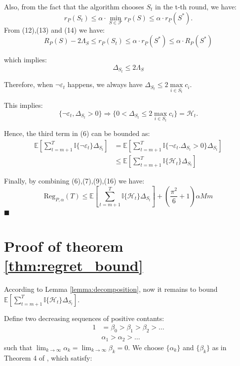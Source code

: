 \documentclass[opre,sglanonrev]{informs4}
\begin{document}
Also, from the fact that the algorithm chooses $S_t$ in the t-th round, we have:
\begin{equation}
	r_{\underline{P}}(S_t)\leq \alpha \cdot \mathop{\min}\limits_{S \in \mathcal{F}}r_{\underline{P}}(S) \leq \alpha \cdot r_{\underline{P}}(S^*).
\end{equation}
From (12),(13) and (14) we have:
\begin{equation}
	R_P(S)-2\Lambda_S \leq r_{\underline{P}}(S_t) \leq \alpha \cdot r_{\underline{P}}(S^*) \leq \alpha \cdot R_P(S^*)
\end{equation}

which implies:
$$
	\Delta_{S_t} \leq 2\Lambda_S
$$

Therefore, when $\lnot \varepsilon_t$ happens, we always have $\Delta_{S_t}\leq 2\mathop{\max}\limits_{i\in S_t}c_i$.

This implies:
$$
	\{\lnot \varepsilon_t, \Delta_{S_t}>0\}\Longrightarrow \{0<\Delta_{S_t}\leq 2\mathop{\max}\limits_{i\in S_t}c_i\}=\mathcal{H}_t.
$$

Hence, the third term in (6) can be bounded as:
\begin{equation}
	\begin{aligned}
		\mathbb{E}[\sum_{t=m+1}^{T}\mathbb{I}\{\lnot \varepsilon_t\}\Delta_{S_t}] &= \mathbb{E}[\sum_{t=m+1}^{T}\mathbb{I}\{\lnot \varepsilon_t. \Delta_{S_t}>0\}\Delta_{S_t}]\\
		&\leq \mathbb{E}[\sum_{t=m+1}^{T}\mathbb{I}\{\mathcal{H}_t\}\Delta_{S_t}]
	\end{aligned}
\end{equation}

Finally, by combining (6),(7),(9),(16) we have:
$$
	\text{Reg}_{P,\alpha}(T) \leq \mathbb{E}[\sum_{t=m+1}^{T}\mathbb{I}\{\mathcal{H}_t\}\Delta_{S_t}] + (\frac{\pi^2}{6}+1)\alpha M m
$$
\hfill $\blacksquare$

\section{Proof of theorem \ref{thm:regret_bound}}
According to Lemma \ref{lemma:decomposition}, now it remains to bound $\mathbb{E}[\sum_{t=m+1}^{T}\mathbb{I}\{\mathcal{H}_t\}\Delta_{S_t}]$.

Define two decreasing sequences of positive contants:
$$\begin{aligned}
1 & =\beta_0>\beta_1>\beta_2>\ldots \\
 & \alpha_1>\alpha_2>\ldots
\end{aligned}$$
such that $\lim_{k \to \infty}\alpha_k = \lim_{k \to \infty}\beta_k=0$. We choose $\{\alpha_k\}$ and $\{\beta_k\}$ as in Theorem 4 of \citep{Kveton2014TightRB}, which satisfy:
\end{document}
